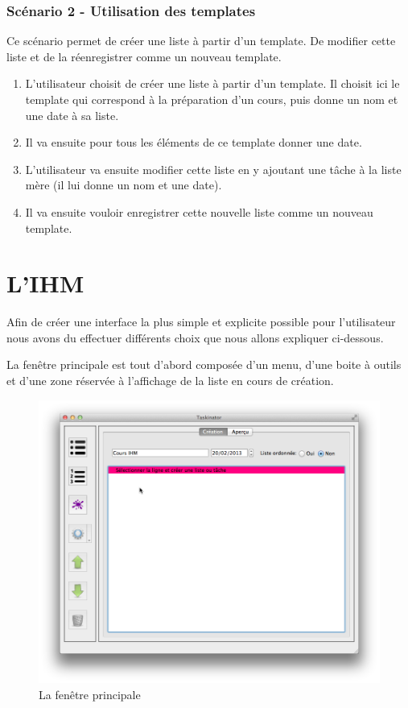 \documentclass[a4paper,10pt]{article}
\begin{document}
\subsubsection{Scénario 2 - Utilisation des templates}
Ce scénario permet de créer une liste à partir d'un template. De modifier cette liste et de la réenregistrer comme un nouveau template.
\begin{enumerate}
\item{L'utilisateur choisit de créer une liste à partir d'un template. Il choisit ici le template qui correspond à la préparation d'un cours, puis donne un nom et une date à sa liste.}
\item{Il va ensuite pour tous les éléments de ce template donner une date.}
\item{L'utilisateur va ensuite modifier cette liste en y ajoutant une tâche à la liste mère (il lui donne un nom et une date).}
\item{Il va ensuite vouloir enregistrer cette nouvelle liste comme un nouveau template.}
\end{enumerate}


\newpage
\section{L'IHM}

Afin de créer une interface la plus simple et explicite possible pour l'utilisateur nous avons du effectuer différents choix que nous allons expliquer ci-dessous.

La fenêtre principale est tout d'abord composée d'un menu, d'une boite à outils et d'une zone réservée à l'affichage de la liste en cours de création.
\begin{figure}[H]
    \center
    \includegraphics[width=14cm]{Images/mainWindow.png}
    \caption{La fenêtre principale}
\end{figure}
\end{document}
